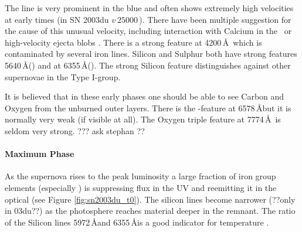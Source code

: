 The  line is very prominent in the blue and often shows extremely high velocities at early times (in SN 2003du $v ~ 25000$\,\kms). There have been multiple suggestion for the cause of this unusual velocity, including interaction with Calcium in the \ism\ or high-velocity ejecta blobs \citep{1999ApJ...525..881H,2004ApJ...607..391G,2004ApJ...601.1019T,2005ApJ...623L..37M,2006ApJ...636..400Q,2006ApJ...645..470T,2007A&A...471..527G}.
There is a strong  feature at 4200\,\AA\ which is contaminated by several iron lines. Silicon and Sulphur both have strong features 5640\,\AA () and at 6355\,\AA (). The strong Silicon feature distinguishes \sneia against other supernovae in the Type I-group. 

It is believed that in these early phases one should be able to see Carbon and Oxygen from the unburned outer layers. There is the -feature at 6578\,\AA but it is normally very weak (if visible at all). The Oxygen triple feature at 7774\,\AA\ is seldom very strong. ??? ask stephan ??

\paragraph{Maximum Phase} As the supernova rises to the peak luminosity a large fraction of iron group elements (especially \Ni) is suppressing flux in the UV and reemitting it in the optical (see Figure \ref{fig:sn2003du_t0}). The silicon lines become narrower (??only in 03du??) as the photosphere reaches material deeper in the remnant. The ratio of the Silicon lines  5972\,\AA and  6355\,\AA is a good indicator for temperature \citep{1995ApJ...455L.147N}. 

